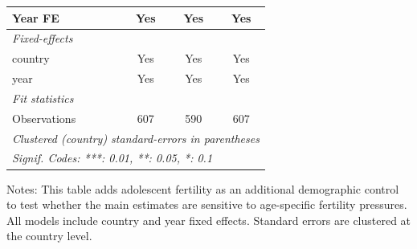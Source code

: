 \begin{table}[htbp]
\begin{tabular}{lccc}
      Year FE                & Yes            & Yes                  & Yes\\  
      \midrule
      \emph{Fixed-effects}\\
      country                & Yes            & Yes                  & Yes\\  
      year                   & Yes            & Yes                  & Yes\\  
      \midrule
      \emph{Fit statistics}\\
      Observations           & 607            & 590                  & 607\\  
      \midrule \midrule
      \multicolumn{4}{l}{\emph{Clustered (country) standard-errors in parentheses}}\\
      \multicolumn{4}{l}{\emph{Signif. Codes: ***: 0.01, **: 0.05, *: 0.1}}\\
   \end{tabular}
\begin{flushleft}
\footnotesize Notes: This table adds adolescent fertility as an additional demographic control to test whether the main estimates are sensitive to age-specific fertility pressures. All models include country and year fixed effects. Standard errors are clustered at the country level.
\end{flushleft}
\end{table}
